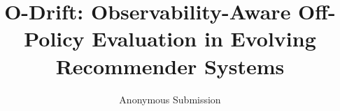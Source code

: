\documentclass[runningheads]{llncs}
\begin{document}
\title{O-Drift: Observability-Aware Off-Policy Evaluation in Evolving Recommender Systems}
\author{Anonymous Submission}
\maketitle












\end{document}
